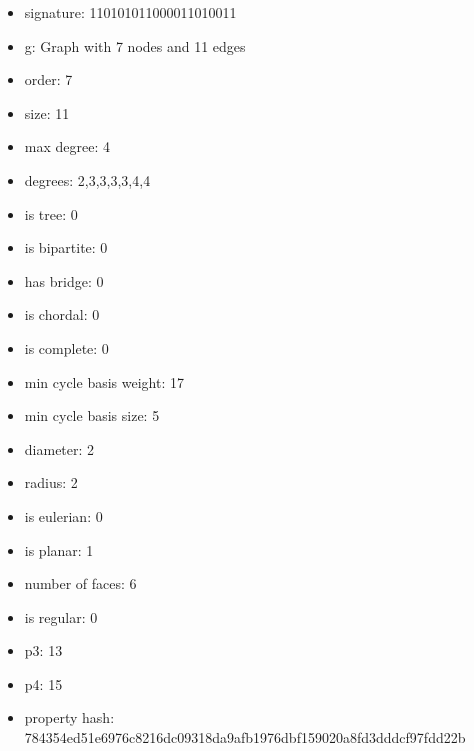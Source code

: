 \begin{itemize}
\item signature: 110101011000011010011
\item g: Graph with 7 nodes and 11 edges
\item order: 7
\item size: 11
\item max degree: 4
\item degrees: 2,3,3,3,3,4,4
\item is tree: 0
\item is bipartite: 0
\item has bridge: 0
\item is chordal: 0
\item is complete: 0
\item min cycle basis weight: 17
\item min cycle basis size: 5
\item diameter: 2
\item radius: 2
\item is eulerian: 0
\item is planar: 1
\item number of faces: 6
\item is regular: 0
\item p3: 13
\item p4: 15
\item property hash: 784354ed51e6976c8216dc09318da9afb1976dbf159020a8fd3dddcf97fdd22b
\end{itemize}
\newpage
\begin{figure}
\end{figure}
